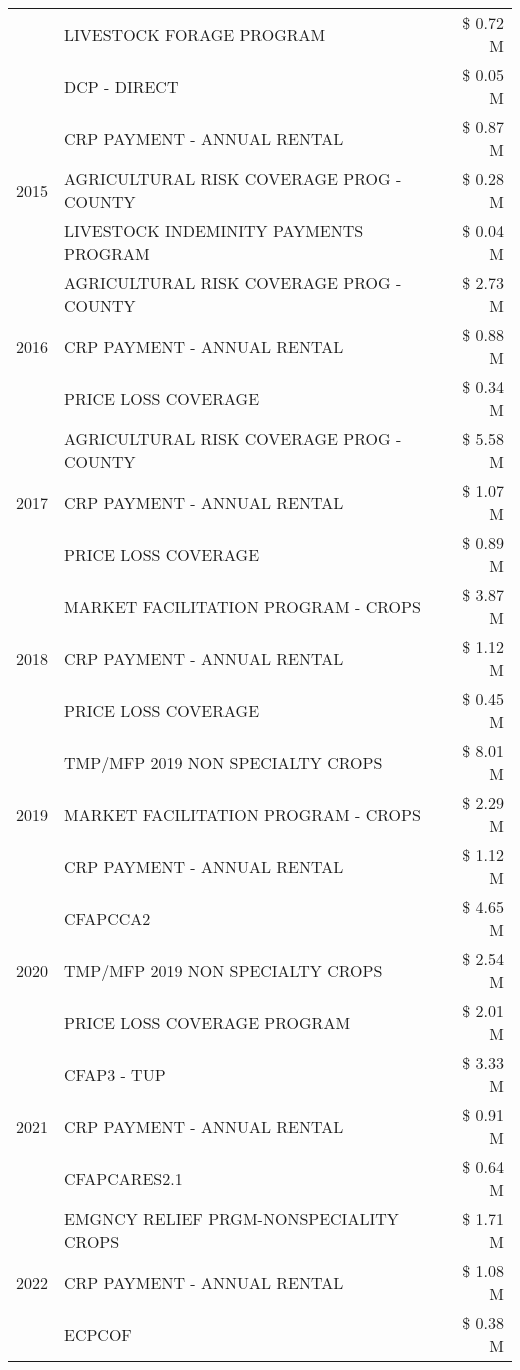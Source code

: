 \begin{tabular}{llr}
 & LIVESTOCK FORAGE PROGRAM & \$ 0.72 M \\
 & DCP - DIRECT & \$ 0.05 M \\
\cline{1-3}
\multirow[t]{3}{*}{2015} & CRP PAYMENT - ANNUAL RENTAL & \$ 0.87 M \\
 & AGRICULTURAL RISK COVERAGE PROG - COUNTY & \$ 0.28 M \\
 & LIVESTOCK INDEMINITY PAYMENTS PROGRAM & \$ 0.04 M \\
\cline{1-3}
\multirow[t]{3}{*}{2016} & AGRICULTURAL RISK COVERAGE PROG - COUNTY & \$ 2.73 M \\
 & CRP PAYMENT - ANNUAL RENTAL & \$ 0.88 M \\
 & PRICE LOSS COVERAGE & \$ 0.34 M \\
\cline{1-3}
\multirow[t]{3}{*}{2017} & AGRICULTURAL RISK COVERAGE PROG - COUNTY & \$ 5.58 M \\
 & CRP PAYMENT - ANNUAL RENTAL & \$ 1.07 M \\
 & PRICE LOSS COVERAGE & \$ 0.89 M \\
\cline{1-3}
\multirow[t]{3}{*}{2018} & MARKET FACILITATION PROGRAM - CROPS & \$ 3.87 M \\
 & CRP PAYMENT - ANNUAL RENTAL & \$ 1.12 M \\
 & PRICE LOSS COVERAGE & \$ 0.45 M \\
\cline{1-3}
\multirow[t]{3}{*}{2019} & TMP/MFP 2019 NON SPECIALTY CROPS & \$ 8.01 M \\
 & MARKET FACILITATION PROGRAM - CROPS & \$ 2.29 M \\
 & CRP PAYMENT - ANNUAL RENTAL & \$ 1.12 M \\
\cline{1-3}
\multirow[t]{3}{*}{2020} & CFAPCCA2 & \$ 4.65 M \\
 & TMP/MFP 2019 NON SPECIALTY CROPS & \$ 2.54 M \\
 & PRICE LOSS COVERAGE PROGRAM & \$ 2.01 M \\
\cline{1-3}
\multirow[t]{3}{*}{2021} & CFAP3 - TUP & \$ 3.33 M \\
 & CRP PAYMENT - ANNUAL RENTAL & \$ 0.91 M \\
 & CFAPCARES2.1 & \$ 0.64 M \\
\cline{1-3}
\multirow[t]{3}{*}{2022} & EMGNCY RELIEF PRGM-NONSPECIALITY CROPS & \$ 1.71 M \\
 & CRP PAYMENT - ANNUAL RENTAL & \$ 1.08 M \\
 & ECPCOF & \$ 0.38 M \\
\cline{1-3}
\bottomrule
\end{tabular}
